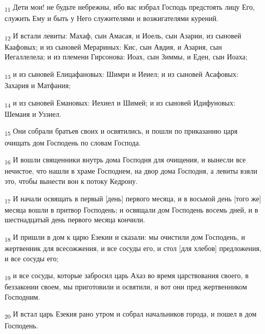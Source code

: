 \begin{tcolorbox}
\textsubscript{11} Дети мои! не будьте небрежны, ибо вас избрал Господь предстоять лицу Его, служить Ему и быть у Него служителями и возжигателями курений.
\end{tcolorbox}
\begin{tcolorbox}
\textsubscript{12} И встали левиты: Махаф, сын Амасая, и Иоель, сын Азарии, из сыновей Каафовых; и из сыновей Мерариных: Кис, сын Авдия, и Азария, сын Иегаллелела; и из племени Гирсонова: Иоах, сын Зиммы, и Еден, сын Иоаха;
\end{tcolorbox}
\begin{tcolorbox}
\textsubscript{13} и из сыновей Елицафановых: Шимри и Иеиел; и из сыновей Асафовых: Захария и Матфания;
\end{tcolorbox}
\begin{tcolorbox}
\textsubscript{14} и из сыновей Емановых: Иехиел и Шимей; и из сыновей Идифуновых: Шемаия и Уззиел.
\end{tcolorbox}
\begin{tcolorbox}
\textsubscript{15} Они собрали братьев своих и освятились, и пошли по приказанию царя очищать дом Господень по словам Господа.
\end{tcolorbox}
\begin{tcolorbox}
\textsubscript{16} И вошли священники внутрь дома Господня для очищения, и вынесли все нечистое, что нашли в храме Господнем, на двор дома Господня, а левиты взяли это, чтобы вынести вон к потоку Кедрону.
\end{tcolorbox}
\begin{tcolorbox}
\textsubscript{17} И начали освящать в первый [день] первого месяца, и в восьмой день [того же] месяца вошли в притвор Господень; и освящали дом Господень восемь дней, и в шестнадцатый день первого месяца кончили.
\end{tcolorbox}
\begin{tcolorbox}
\textsubscript{18} И пришли в дом к царю Езекии и сказали: мы очистили дом Господень, и жертвенник для всесожжения, и все сосуды его, и стол [для хлебов] предложения, и все сосуды его;
\end{tcolorbox}
\begin{tcolorbox}
\textsubscript{19} и все сосуды, которые забросил царь Ахаз во время царствования своего, в беззаконии своем, мы приготовили и освятили, и вот они пред жертвенником Господним.
\end{tcolorbox}
\begin{tcolorbox}
\textsubscript{20} И встал царь Езекия рано утром и собрал начальников города, и пошел в дом Господень.
\end{tcolorbox}
